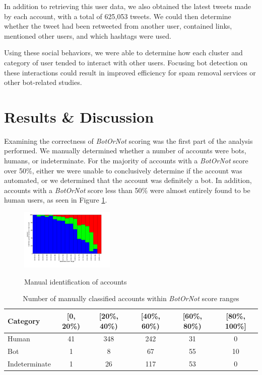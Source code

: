 \documentclass{sig-alternate-05-2015}
\begin{document}
In addition to retrieving this user data, we also obtained the latest tweets made by each account, with a total of 625,053 tweets. We could then determine whether the tweet had been retweeted from another user, contained links, mentioned other users, and which hashtags were used.

Using these social behaviors, we were able to determine how each cluster and category of user tended to interact with other users. Focusing bot detection on these interactions could result in improved efficiency for spam removal services or other bot-related studies.

\section{Results \& Discussion}

Examining the correctness of \emph{BotOrNot} scoring was the first part of the analysis performed. We manually determined whether a number of accounts were bots, humans, or indeterminate. For the majority of accounts with a \emph{BotOrNot} score over 50\%, either we were unable to conclusively determine if the account was automated, or we determined that the account was definitely a bot. In addition, accounts with a \emph{BotOrNot} score less than 50\% were almost entirely found to be human users, as seen in Figure \ref{fig:scorescat}.

\begin{figure}[h!]
	\caption{Manual identification of accounts}
	\centering
		\includegraphics[width=0.4\textwidth]{imgs/scoreperc}
	\label{fig:scorescat}
	
\end{figure}

\begin{table}
\centering
\begin{tabular}{l*{5}{c}}
Category          & [0, 20\%) & [20\%, 40\%) & [40\%, 60\%) & [60\%, 80\%) & [80\%, 100\%] \\
\hline
Human 								& 41 & 348 & 242 & 31 & 0  \\
Bot            & 1 & 8 & 67 & 55 & 10  \\
Indeterminate           & 1 & 26 & 117 & 53 &  0  \\
\end{tabular}
\caption{Number of manually classified accounts within \emph{BotOrNot} score ranges}
\end{table}
\end{document}
